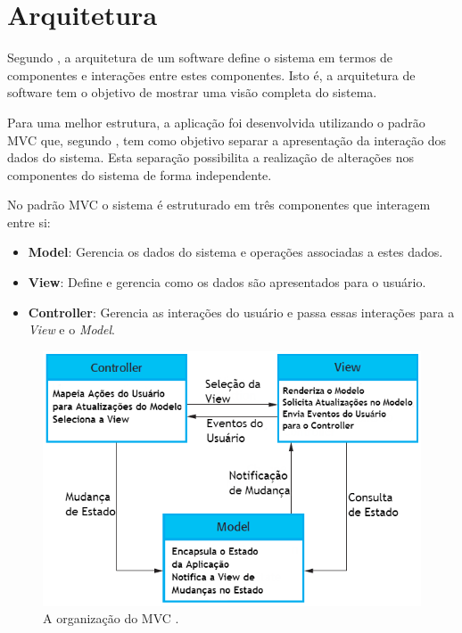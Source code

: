 \section{Arquitetura}

Segundo \cite{Garlan:1994:ISA:865128}, a arquitetura de um software define o sistema em termos de componentes e interações entre estes componentes. Isto é, a arquitetura de software tem o objetivo de mostrar uma visão completa do sistema.

Para uma melhor estrutura, a aplicação foi desenvolvida utilizando o padrão \ac{MVC} que, segundo \cite{Sommerville10}, tem como objetivo separar a apresentação da interação dos dados do sistema. Esta separação possibilita a realização de alterações nos componentes do sistema de forma independente.

No padrão \ac{MVC} o sistema é estruturado em três componentes que interagem entre si:

\begin{itemize}
	\item{\textbf{Model}: Gerencia os dados do sistema e operações associadas a estes dados.}
	
	\item{\textbf{View}: Define e gerencia como os dados são apresentados para o usuário.}
	
	\item{\textbf{Controller}: Gerencia as interações do usuário e passa essas interações para a \textit{View} e o \textit{Model}.}
\end{itemize}


\begin{figure}
	\centering
	\includegraphics[scale=0.65]{imagens/mvc.png}
	\caption{A organização do MVC \citep{Sommerville10}.}
	\label{fig:mvc}
\end{figure} 

